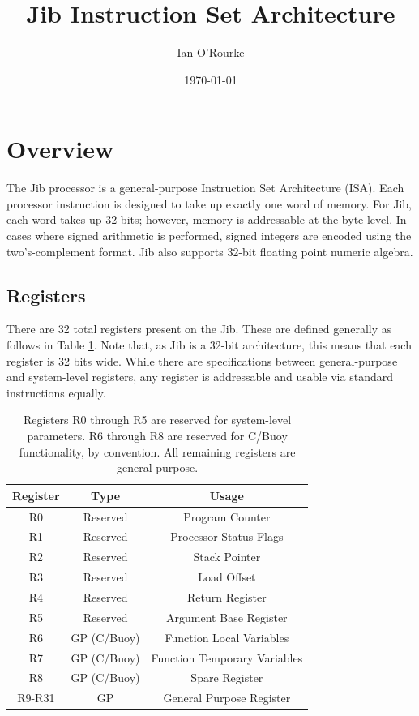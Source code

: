 \documentclass{article}
\title{Jib Instruction Set Architecture}
\author{Ian O'Rourke}
\date{\today \\ \titlelogoimage}
\begin{document}
\maketitle

\section{Overview}

The Jib processor is a general-purpose Instruction Set Architecture (ISA). Each processor instruction is designed to take up exactly one word of memory. For Jib, each word takes up 32 bits; however, memory is addressable at the byte level. In cases where signed arithmetic is performed, signed integers are encoded using the two's-complement format. Jib also supports 32-bit floating point numeric algebra.

\subsection{Registers}
\label{sec:registers}

There are 32 total registers present on the Jib. These are defined generally as follows in Table \ref{table:register-setup}. Note that, as Jib is a 32-bit architecture, this means that each register is 32 bits wide. While there are specifications between general-purpose and system-level registers, any register is addressable and usable via standard instructions equally.

\begin{table}[h!]
    \centering
    \begin{tabular}{c|cc}
        \hline
        Register & Type & Usage \\
        \hline
        R0 & Reserved & Program Counter \\
        R1 & Reserved & Processor Status Flags \\
        R2 & Reserved& Stack Pointer \\
        R3 & Reserved & Load Offset \\
        R4 & Reserved & Return Register \\
        R5 & Reserved & Argument Base Register \\
        \hline
        R6 & GP (C/Buoy) & Function Local Variables \\
        R7 & GP (C/Buoy) & Function Temporary Variables \\
        R8 & GP (C/Buoy) & Spare Register \\
        \hline
        R9-R31 & GP & General Purpose Register \\
        \hline
    \end{tabular}
    \caption{Registers R0 through R5 are reserved for system-level parameters. R6 through R8 are reserved for C/Buoy functionality, by convention. All remaining registers are general-purpose.}
    \label{table:register-setup}
\end{table}
\end{document}

